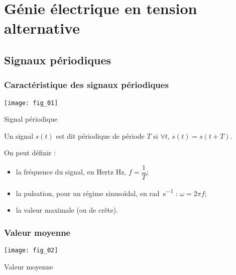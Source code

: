 \setchapterpreamble[u]{\margintoc}

\chapter{Génie électrique en tension alternative}








\section{Signaux périodiques}
\subsection{Caractéristique des signaux périodiques}

\begin{marginfigure}
\texttt{[image: fig\_01]}
\caption{Signal périodique \label{fig:ge:cours:01}}
\end{marginfigure}

\begin{defi}
Un signal $s(t)$ est dit périodique de période $T$ si $\forall t$, $s(t)=s(t+T)$.
\end{defi}

\begin{defi}[Caractéristiques]
On peut définir : 
\begin{itemize}
\item la fréquence du signal, en Hertz \si{Hz}, $f=\dfrac{1}{T}$;
\item la pulsation, pour un régime sinusoïdal, en \si{rad.s^{-1}} :  $\omega = 2\pi f$;
\item la valeur maximale (ou de crête). 
\end{itemize}
\end{defi}

\subsection{Valeur moyenne}
\begin{marginfigure}
\texttt{[image: fig\_02]}
\caption{Valeur moyenne\label{fig:ge:cours:02}}
\end{marginfigure}


